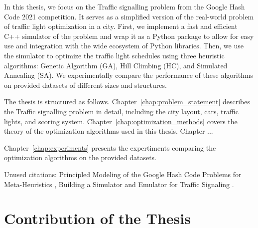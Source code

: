 In this thesis, we focus on the Traffic signalling problem from the Google Hash Code 2021 competition. It serves as a simplified version of the real-world problem of traffic light optimization in a city. First, we implement a fast and efficient C++ simulator of the problem and wrap it as a Python package to allow for easy use and integration with the wide ecosystem of Python libraries. Then, we use the simulator to optimize the traffic light schedules using three heuristic algorithms: Genetic Algorithm (GA), Hill Climbing (HC), and Simulated Annealing (SA). We experimentally compare the performance of these algorithms on provided datasets of different sizes and structures.

The thesis is structured as follows. Chapter~\ref{chap:problem_statement} describes the Traffic signalling problem in detail, including the city layout, cars, traffic lights, and scoring system. Chapter~\ref{chap:optimization_methods} covers the theory of the optimization algorithms used in this thesis. Chapter ...

Chapter~\ref{chap:experiments} presents the expertiments comparing the optimization algorithms on the provided datasets.

Unused citations: Principled Modeling of the Google Hash Code Problems for Meta-Heuristics \cite{rodrigues2023principled}, Building a Simulator and Emulator for Traffic Signaling \cite{li2022building}.

\section*{Contribution of the Thesis} \label{sec:contribution_of_the_thesis}
